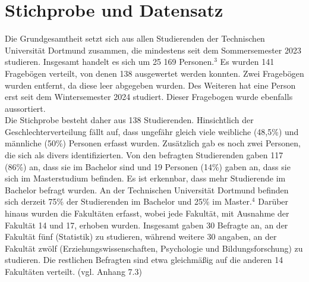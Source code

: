 \documentclass[11pt, a4paper]{article}
\begin{document}
\section{Stichprobe und Datensatz}
\label{Stichprobe und Datensatz}
Die Grundgesamtheit setzt sich aus allen Studierenden der Technischen Universität Dortmund zusammen, die mindestens seit dem Sommersemester 2023 studieren. Insgesamt handelt es sich um 25 169 Personen.\hyperref[seitenverweis]{$^3$} Es wurden 141 Fragebögen verteilt, von denen 138 ausgewertet werden konnten. Zwei Fragebögen wurden entfernt, da diese leer abgegeben wurden. Des Weiteren hat eine Person erst seit dem Wintersemester 2024 studiert. Dieser Fragebogen wurde ebenfalls aussortiert. \\
Die Stichprobe besteht daher aus 138 Studierenden. Hinsichtlich der Geschlechterverteilung fällt auf, dass ungefähr gleich viele weibliche (48,5\%) und männliche (50\%) Personen erfasst wurden. Zusätzlich gab es noch zwei Personen, die sich als divers identifizierten. Von den befragten Studierenden gaben 117 (86\%) an, dass sie im Bachelor sind und 19 Personen (14\%) gaben an, dass sie sich im Masterstudium befinden. Es ist erkennbar, dass mehr Studierende im Bachelor befragt wurden. An der Technischen Universität Dortmund befinden sich derzeit 75\% der Studierenden im Bachelor und 25\% im Master.\hyperref[seitenverweis]{$^4$} Darüber hinaus wurden die Fakultäten erfasst, wobei jede Fakultät, mit Ausnahme der Fakultät 14 und 17, erhoben wurden. Insgesamt gaben 30 Befragte an, an der Fakultät fünf (Statistik) zu studieren, während weitere 30 angaben, an der Fakultät zwölf (Erziehungswissenschaften, Psychologie und Bildungsforschung) zu studieren. Die restlichen Befragten sind etwa gleichmäßig auf die anderen 14 Fakultäten verteilt. (vgl. Anhang 7.3)\\
\end{document}
